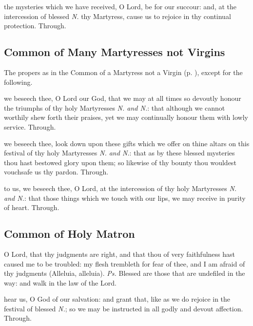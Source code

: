 \postcommunion
{} the mysteries which we have received, O Lord, be for our succour: and, at the intercession of blessed \textit{N.} thy Martyress, cause us to rejoice in thy continual protection. Through.


\subsection{Common of Many Martyresses not Virgins}\label{CommonMartyrsNotVirgins}

\begin{rubric}
	The propers as in the Common of a Martyress not a Virgin (p. \pageref{CommonMartyrNotVirgin}), except for the following.
\end{rubric}

\collect
{} we beseech thee, O Lord our God, that we may at all times so devoutly honour the triumphs of thy holy Martyresses \textit{N. and N.}: that although we cannot worthily shew forth their praises, yet we may continually honour them with lowly service. Through.

\secret
{} we beseech thee, look down upon these gifts which we offer on thine altars on this festival of thy holy Martyresses \textit{N. and N.}: that as by these blessed mysteries thou hast bestowed glory upon them; so likewise of thy bounty thou wouldest vouchsafe us thy pardon. Through.

\postcommunion
{} to us, we beseech thee, O Lord, at the intercession of thy holy Martyresses \textit{N. and N.}: that those things which we touch with our lips, we may receive in purity of heart. Through.


\subsection{Common of Holy Matron}\label{CommonNeitherVirginMartyr}

\introit
{} O Lord, that thy judgments are right, and that thou of very faithfulness hast caused me to be troubled: my flesh trembleth for fear of thee, and I am afraid of thy judgments (Alleluia, alleluia). \textit{Ps.} Blessed are those that are undefiled in the way: and walk in the law of the Lord.

\collect
{} hear us, O God of our salvation: and grant that, like as we do rejoice in the festival of blessed \textit{N.}; so we may be instructed in all godly and devout affection. Through.

